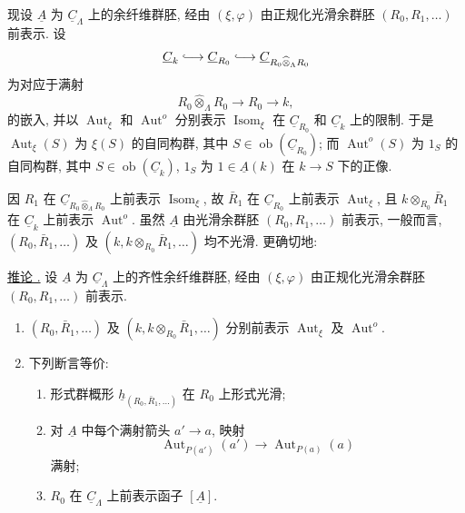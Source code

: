 现设 $\underline A$ 为 $\underline C_\Lambda$ 上的余纤维群胚,
经由 $(\xi,\varphi)$ 由正规化光滑余群胚 $(R_0,R_1,\ldots)$ 前表示.
设
\[
 \underline C_k\lhook\joinrel\longrightarrow
 \underline C_{R_0}\lhook\joinrel\longrightarrow
 \underline C_{R_0\widehat\otimes_\Lambda R_0}
\]
为对应于满射
\[
 R_0\widehat\otimes_\Lambda R_0\longrightarrow R_0\longrightarrow k,
\]
的嵌入, 并以 $\operatorname{Aut}_\xi$ 和 $\operatorname{Aut}^{o}$
分别表示 $\operatorname{Isom}_\xi$ 在 $\underline C_{R_0}$ 和 $\underline C_k$ 上的限制.
于是 $\operatorname{Aut}_\xi(S)$ 为 $\xi(S)$ 的自同构群,
其中 $S\in\operatorname{ob}(\underline C_{R_0})$;
而 $\operatorname{Aut}^{o}(S)$ 为 $1_S$ 的自同构群,
其中 $S\in\operatorname{ob}(\underline C_k)$,
$1_S$ 为 $1\in\underline A(k)$ 在 $k\longrightarrow S$ 下的正像.

因 $R_1$ 在 $\underline C_{R_0\widehat\otimes_\Lambda R_0}$ 上前表示
$\operatorname{Isom}_\xi$, 故 $\bar R_1$ 在 $\underline C_{R_0}$ 上前表示
$\operatorname{Aut}_\xi$, 且 $k\otimes_{R_0}\bar R_1$ 在
$\underline C_k$ 上前表示 $\operatorname{Aut}^{o}$.
虽然 $\underline A$ 由光滑余群胚 $(R_0,R_1,\ldots)$ 前表示,
一般而言, $(R_0,\bar R_1,\ldots)$ 及
$(k,k\otimes_{R_0}\bar R_1,\ldots)$ 均不光滑. 更确切地:

\underline{推论 .}
设 $\underline A$ 为 $\underline C_\Lambda$ 上的齐性余纤维群胚,
经由 $(\xi,\varphi)$ 由正规化光滑余群胚 $(R_0,R_1,\ldots)$ 前表示.

\begin{enumerate}[label=(\alph*)]
\item $(R_0,\bar R_1,\ldots)$ 及 $(k,k\otimes_{R_0}\bar R_1,\ldots)$
分别前表示 $\operatorname{Aut}_\xi$ 及 $\operatorname{Aut}^{o}$.

\item 下列断言等价:
\begin{enumerate}[label=(\roman*)]
\item 形式群概形 $\underline h_{(R_0,\bar R_1,\ldots)}$ 在 $R_0$ 上形式光滑;
\item 对 $\underline A$ 中每个满射箭头 $a'\longrightarrow a$, 映射
\[
 \operatorname{Aut}_{P(a')}(a')\longrightarrow
 \operatorname{Aut}_{P(a)}(a)
\]
满射;
\item $R_0$ 在 $\underline C_\Lambda$ 上前表示函子 $[\underline A]$.
\end{enumerate}
\end{enumerate}


